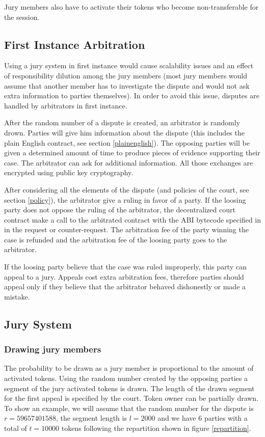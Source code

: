 \documentclass[12 pt]{article}
\begin{document}
Jury members also have to activate their tokens who become non-transferable for the session.

\subsection{First Instance Arbitration}

Using a jury system in first instance would cause scalability issues and an effect of responsibility dilution among the jury members (most jury members would assume that another member has to investigate the dispute and would not ask extra information to parties themselves).
In order to avoid this issue, disputes are handled by arbitrators in first instance.


After the random number of a dispute is created, an arbitrator is randomly drown. Parties will give him information about the dispute (this includes the plain English contract, see section \ref{plainenglish}).
The opposing parties will be given a determined amount of time to produce pieces of evidence supporting their case. The arbitrator can ask for additional information.
All those exchanges are encrypted using public key cryptography.

After considering all the elements of the dispute (and policies of the court, see section \ref{policy}), the arbitrator give a ruling in favor of a party.
If the loosing party does not oppose the ruling of the arbitrator, the decentralized court contract make a call to the arbitrated contract with the ABI bytecode specified in in the request or counter-request. The arbitration fee of the party winning the case is refunded and the arbitration fee of the loosing party goes to the arbitrator.

If the loosing party believe that the case was ruled improperly, this party can appeal to a jury.
Appeals cost extra arbitration fees, therefore parties should appeal only if they believe that the arbitrator behaved dishonestly or made a mistake.

\subsection{Jury System}

\subsubsection{Drawing jury members}

The probability to be drawn as a jury member is proportional to the amount of activated tokens. Using the random number created by the opposing parties a segment of the jury activated tokens is drawn.
The length of the drawn segment for the first appeal is specified by the court. 
Token owner can be partially drawn.
To show an example, we will assume that the random number for the dispute is $r=59657401588$, the segment length is $l=2000$ and we have 6 parties with a total of $t=10 000$ tokens following the repartition shown in figure \ref{repartition}.
\end{document}
